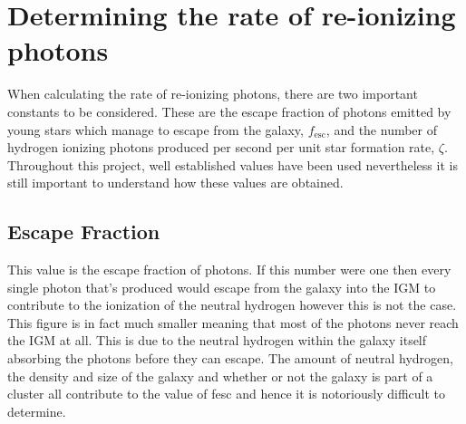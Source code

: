
\section{Determining the rate of re-ionizing photons} %
\label{sec:determining_the_rate_of_re_ionizing_photons}
	When calculating the rate of re-ionizing photons, there are two important constants to be considered. These are the escape fraction of photons emitted by young stars which manage to escape from the galaxy, $f_\text{esc}$, and the number of hydrogen ionizing photons produced per second per unit star formation rate, $\zeta$. Throughout this project, well established values have been used nevertheless it is still important to understand how these values are obtained.

	\subsection{Escape Fraction} %
	\label{sub:escape_fraction}
		This value is the escape fraction of photons. If this number were one then every single photon that’s produced would escape from the galaxy into the IGM to contribute to the ionization of the neutral hydrogen however this is not the case. This figure is in fact much smaller meaning that most of the photons never reach the IGM at all. This is due to the neutral hydrogen within the galaxy itself absorbing the photons before they can escape. The amount of neutral hydrogen, the density and size of the galaxy and whether or not the galaxy is part of a cluster all contribute to the value of fesc and hence it is notoriously difficult to determine.

